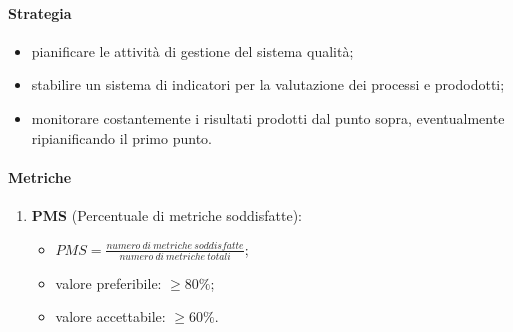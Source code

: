         \paragraph{Strategia}
            \begin{itemize}
                \item pianificare le attività di gestione del sistema qualità;
                \item stabilire un sistema di indicatori per la valutazione dei processi e prododotti;
                \item monitorare costantemente i risultati prodotti dal punto sopra, eventualmente ripianificando il primo punto.
            \end{itemize}
        \paragraph{Metriche}
        \begin{enumerate}
        \item \textbf{PMS} (Percentuale di metriche soddisfatte):
        \begin{itemize}
            \item $PMS = \frac{numero\ di\ metriche\ soddisfatte}{numero\ di\ metriche\ totali}$;
            \item valore preferibile: $\geq 80\%$;
            \item valore accettabile: $\geq 60\%$.
        \end{itemize}
    \end{enumerate}